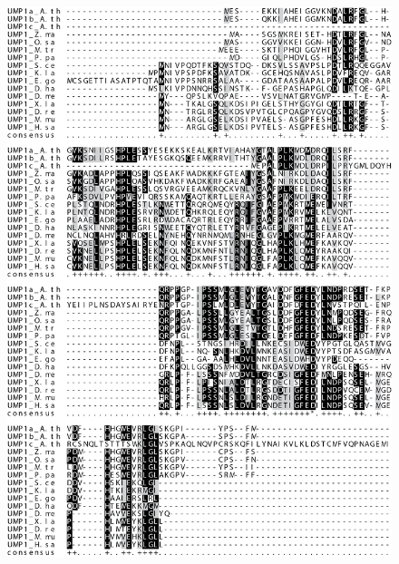 \begin{figure}[ht]
	\centering
	\includegraphics[width=\columnwidth]{Proteasome/ump1align1.png}
	{}
	\label{fig:ump1align}
\end{figure}


